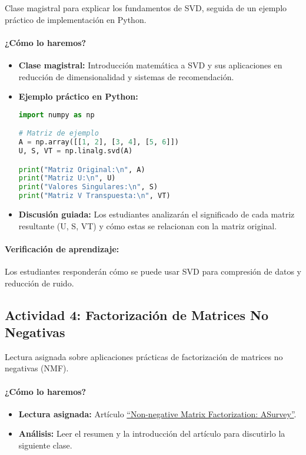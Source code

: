 \documentclass[a4,11pt]{aleph-notas}
\begin{document}
Clase magistral para explicar los fundamentos de SVD, seguida de un ejemplo práctico de implementación en Python.

\paragraph{¿Cómo lo haremos?}  
\begin{itemize}[leftmargin=*]
    \item \textbf{Clase magistral:}  
    Introducción matemática a SVD y sus aplicaciones en reducción de dimensionalidad y sistemas de recomendación.

    \item \textbf{Ejemplo práctico en Python:}  
\begin{pycodigo}
\begin{lstlisting}[language=Python]
import numpy as np

# Matriz de ejemplo
A = np.array([[1, 2], [3, 4], [5, 6]])
U, S, VT = np.linalg.svd(A)

print("Matriz Original:\n", A)
print("Matriz U:\n", U)
print("Valores Singulares:\n", S)
print("Matriz V Transpuesta:\n", VT)
\end{lstlisting}
\end{pycodigo}
    \item \textbf{Discusión guiada:}  
    Los estudiantes analizarán el significado de cada matriz resultante (U, S, VT) y cómo estas se relacionan con la matriz original.
\end{itemize}

\paragraph{Verificación de aprendizaje:}  
Los estudiantes responderán cómo se puede usar SVD para compresión de datos y reducción de ruido.

\subsection*{Actividad 4: Factorización de Matrices No Negativas}

Lectura asignada sobre aplicaciones prácticas de factorización de matrices no negativas (NMF).

\paragraph{¿Cómo lo haremos?}  
\begin{itemize}[leftmargin=*]
    \item \textbf{Lectura asignada:}  
    Artículo \href{https://mro.massey.ac.nz/server/api/core/bitstreams/7dbd6b5e-4d71-490a-b1b6-654e40181693/content}{“Non-negative Matrix Factorization: ASurvey”}.  
    \item \textbf{Análisis:}  
    Leer el resumen y la introducción del artículo para discutirlo la siguiente clase.
\end{itemize}
\end{document}
